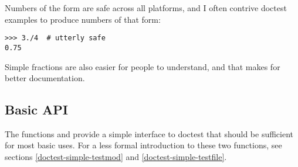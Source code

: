 Numbers of the form  are safe across all platforms, and I
often contrive doctest examples to produce numbers of that form:

\begin{verbatim}
>>> 3./4  # utterly safe
0.75
\end{verbatim}

Simple fractions are also easier for people to understand, and that makes
for better documentation.

\subsection{Basic API\label{doctest-basic-api}}

The functions  and  provide a
simple interface to doctest that should be sufficient for most basic
uses.  For a less formal introduction to these two functions, see
sections \ref{doctest-simple-testmod} and
\ref{doctest-simple-testfile}.


